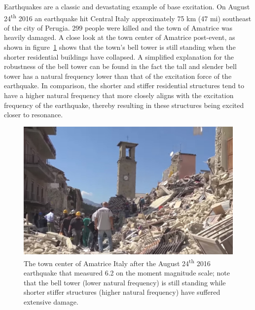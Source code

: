 \documentclass[12pt,letter]{article}
\numberwithin{ex}{section} %
\numberwithin{re}{section} %
\newtheorem{vcs}{Vibration Case Study}
\numberwithin{vcs}{section} %
\newenvironment{vibration_case_study}{\begin{mdframed}[linecolor=orange,middlelinewidth=2mm,roundcorner=20pt]\begin{vcs}\normalfont}{\end{vcs}\end{mdframed}}
\begin{document}
		\begin{vibration_case_study}
					
			Earthquakes are a classic and devastating example of base excitation. On August 24\textsuperscript{th} 2016 an earthquake hit Central Italy approximately 75 km (47 mi) southeast of the city of Perugia. 299 people were killed and the town of Amatrice was heavily damaged. A close look at the town center of Amatrice post-event, as shown in figure~\ref{fig:Italy_2016_earthquake_1} shows that the town's bell tower is still standing when the shorter residential buildings have collapsed. A simplified explanation for the robustness of the bell tower can be found in the fact the tall and slender bell tower has a natural frequency lower than that of the excitation force of the earthquake. In comparison, the shorter and stiffer residential structures tend to have a higher natural frequency that more closely aligns with the excitation frequency of the earthquake, thereby resulting in these structures being excited closer to resonance. 
						
			\begin{figure}[H]
				\centering
				\includegraphics[width=1\textwidth]{../figures/Italy_2016_earthquake_1}
				\caption{The town center of Amatrice Italy after the August 24\textsuperscript{th} 2016 earthquake that measured 6.2  on the moment magnitude scale; note that the bell tower (lower natural frequency) is still standing while shorter stiffer structures (higher natural frequency) have suffered extensive damage. \protect\footnotemark[1] }
				\label{fig:Italy_2016_earthquake_1}
			\end{figure}
			

\end{vibration_case_study}
\end{document}
